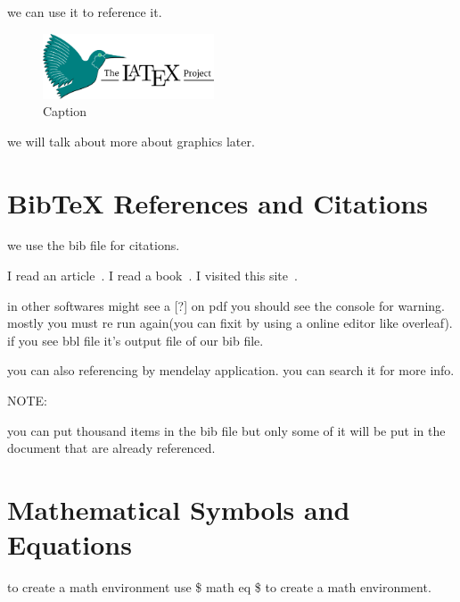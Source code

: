 \documentclass{article} %
\begin{document}
        we can use it to reference it.
        
        \begin{figure}[htbp]
            \centering
            \includegraphics[width=2in]{latex.png}
            \caption{Caption}
            \label{fig:my_label}
        \end{figure}
        
    \noindent we will talk about more about graphics later.
    
    
    
\section{BibTeX References and Citations}

    we use the bib file for citations.
    
    I read an article~\cite{ali2012}. I read a book~\cite{kim2006}. I visited this site~\cite{site}.
    
    
    
    
    in other softwares might see a [?] on pdf you should see the console for warning. mostly you must re run again(you can fixit by using a online editor like overleaf). if you see bbl file it's output file of our bib file. 
    
    you can also referencing by mendelay application. you can search it for more info.
    
    \noindent NOTE:
    
        you can put thousand items in the bib file but only some of it will be put in the document that are already referenced.
    
    
\section{Mathematical Symbols and Equations}  

    to create a math environment use \$ math eq \$ to create a math environment.
    
\end{document}
